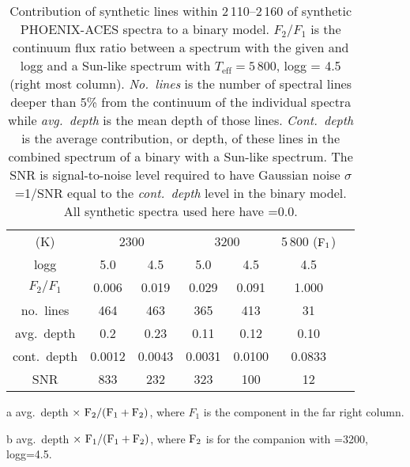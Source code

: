 
\begin{table}
    \small
    \centering
    \begin{threeparttable}[b]

   \caption{Contribution of synthetic lines within 2\,110--2\,160\nm{} of synthetic {PHOENIX-ACES} spectra to a binary model. \(F_{2}/F_{1}\) is the continuum flux ratio between a spectrum with the given \teff{} and logg and a Sun-like spectrum with \(T_{\textrm{eff}}=5\,800\), logg = 4.5 (right most column). \emph{No.\ lines} is the number of spectral lines deeper than 5\% from the continuum of the individual spectra while \emph{avg.\ depth} is the mean depth of those lines. \emph{Cont.\ depth} is the average contribution, or depth, of these lines in the combined spectrum of a binary with a Sun-like spectrum. The {SNR} is signal-to-noise level required to have Gaussian noise \(\sigma\) =1/{SNR} equal to the \emph{cont.\ depth} level in the binary model. All synthetic spectra used here have \feh{}=0.0.}
    
    \begin{tabular}{*7c}
        \toprule
        \teff{} (K)  & \multicolumn{2}{c}{2300} & \multicolumn{2}{c}{3200} & 5\,800 (\(\rm F_1\))\\
        logg & 5.0 & 4.5  & 5.0 & 4.5 & 4.5 \\
        \midrule
        \(F_2/F_1\) & 0.006 & 0.019 & 0.029  & 0.091 & 1.000 \\  
        no.\ lines & 464 & 463 & 365  & 413 & 31 \\
        avg.\ depth & 0.2  & 0.23& 0.11 & 0.12 & 0.10 \\
        cont.\ depth\tnote{a} &  0.0012 & 0.0043 &  0.0031 & 0.0100&  0.0833\tnote{b} \\ 
        {SNR}  & 833 & 232 & 323  & 100 & 12 \\ 
        \bottomrule
    \end{tabular}
 \label{tab:line_contributions}
    \begin{tablenotes}
        \item [a] avg.\ depth \(\times~ \rm F_2 / (F_1 + F_2)\), where \(F_1\) is the component in the far right column.
        \item[b] avg.\ depth \(\times~ \rm F_1 / (F_1 + F_2)\), where \(\rm F_2\) is for the companion with \teff{}=3200, logg=4.5.
    \end{tablenotes}
  \end{threeparttable}
   
\end{table}